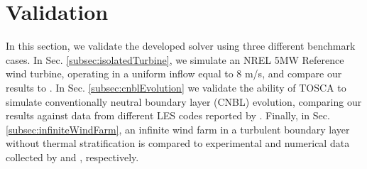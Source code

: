 \documentclass[journal abbreviation, manuscript]{copernicus}
\begin{document}
\section{Validation}
\label{sec:validation}
In this section, we validate the developed solver using three different benchmark cases. In Sec. \ref{subsec:isolatedTurbine}, we simulate an NREL 5MW Reference wind turbine, operating in a uniform inflow equal to $8$ m/s, and compare our results to \cite{2015_TossasLeonardi}. In Sec. \ref{subsec:cnblEvolution} we validate the ability of TOSCA to simulate conventionally neutral boundary layer (CNBL) evolution, comparing our results against data from different LES codes reported by \cite{2016_AllaertsPhD}. Finally, in Sec. \ref{subsec:infiniteWindFarm}, an infinite wind farm in a turbulent boundary layer without thermal stratification is compared to experimental and numerical data collected by \cite{2011_ChamorroPortéAgel} and \cite{2018_StevensEtAl}, respectively. 
 
\end{document}
